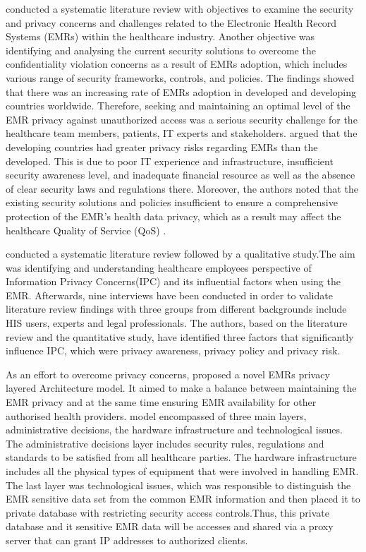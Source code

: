 \citet{Mahfuth2016} conducted a systematic literature review with objectives to examine the security and privacy concerns and challenges related to the Electronic Health Record Systems (EMRs) within the healthcare industry. Another objective was identifying and analysing the current security solutions to overcome the confidentiality violation concerns as a result of  EMRs adoption, which includes various range of security frameworks, controls, and policies. The findings showed that there was an increasing rate of EMRs adoption in developed and developing countries worldwide. Therefore, seeking and maintaining an optimal level of the EMR privacy against unauthorized access was a serious security challenge for the healthcare team members, patients, IT experts and stakeholders. \citet{Mahfuth2016} argued that the developing countries had greater privacy risks regarding EMRs than the developed. This is due to poor IT experience and  infrastructure, insufficient security awareness level, and inadequate financial resource as well as the absence of clear security laws and regulations there. Moreover, the authors noted that the existing security solutions and policies  insufficient to ensure a comprehensive protection of the EMR's health data privacy, which as a result may affect the healthcare Quality of Service (QoS) \cite{Mahfuth2016}.

\citet{Rahim2016} conducted a systematic literature review followed by a qualitative study.The aim was identifying and understanding healthcare employees perspective of Information Privacy Concerns(IPC) and its influential factors when using the EMR. Afterwards, nine interviews have been conducted in order to validate literature review findings with three groups from different backgrounds include HIS users, experts and legal professionals. The authors, based on the literature review and the quantitative study,  have identified three factors that significantly influence IPC, which were privacy awareness, privacy policy and privacy risk. 

As an effort to overcome privacy concerns, \citet{Bensefia2014} proposed a novel EMRs privacy layered Architecture model. It aimed to make a balance between maintaining the EMR privacy and at the same time ensuring EMR availability for other authorised health providers. \citet{Bensefia2014} model encompassed of three main layers, administrative decisions, the hardware infrastructure and technological issues. The administrative decisions layer includes security rules, regulations and standards to be satisfied from all healthcare parties. The hardware infrastructure includes all the physical types of equipment that were involved in handling EMR. The last layer was technological issues, which was responsible to distinguish the EMR sensitive data set from the common EMR information and then placed it to private database with restricting security access controls.Thus, this private database and it sensitive EMR data will be accesses and shared via a proxy server that can grant IP addresses to authorized clients. 

